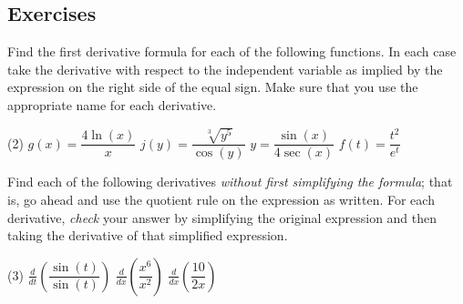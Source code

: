 \documentclass[12pt,]{book}
\theoremstyle{plain}
\theoremstyle{definition}
\numberwithin{equation}{section}
\newcommand{\fe}[2]{#1\mathopen{}\left(#2\right)\mathclose{}}
\newcommand{\lzoo}[2]{{\frac{d}{d#1}}{\left(#2\right)}}
\begin{document}
\subsection[Exercises]{Exercises}\label{exercises-38}
\hypertarget{exercisegroup-78}{\null}Find the first derivative formula for each of the following functions.  In each case take the derivative with respect to the independent variable as implied by the expression on the right side of the equal sign.  Make sure that you use the appropriate name for each derivative.%
\par
\begin{exercisegroup}(2)
\exercise[1.]\hypertarget{exercise-378}{\null}\(\fe{g}{x}=\dfrac{4\fe{\ln}{x}}{x}\)%
\exercise[2.]\hypertarget{exercise-379}{\null}\(\fe{j}{y}=\dfrac{\sqrt[3]{y^5}}{\fe{\cos}{y}}\)%
\exercise[3.]\hypertarget{exercise-380}{\null}\(y=\dfrac{\fe{\sin}{x}}{4\fe{\sec}{x}}\)%
\exercise[4.]\hypertarget{exercise-381}{\null}\(\fe{f}{t}=\dfrac{t^2}{e^t}\)%
\end{exercisegroup}
\par\smallskip\noindent
\hypertarget{exercisegroup-unsimplified-quotient}{\null}Find each of the following derivatives \emph{without first simplifying the formula}; that is, go ahead and use the quotient rule on the expression as written. For each derivative, \emph{check} your answer by simplifying the original expression and then taking the derivative of that simplified expression.%
\par
\begin{exercisegroup}(3)
\exercise[5.]\hypertarget{unsimplified-quotient-first}{\null}\(\lzoo{t}{\dfrac{\fe{\sin}{t}}{\fe{\sin}{t}}}\)%
\exercise[6.]\hypertarget{exercise-383}{\null}\(\lzoo{x}{\dfrac{x^6}{x^2}}\)%
\exercise[7.]\hypertarget{unsimplified-quotient-last}{\null}\(\lzoo{x}{\dfrac{10}{2x}}\)%
\end{exercisegroup}
\par\smallskip\noindent
\typeout{************************************************}
\typeout{************************************************}
\end{document}
